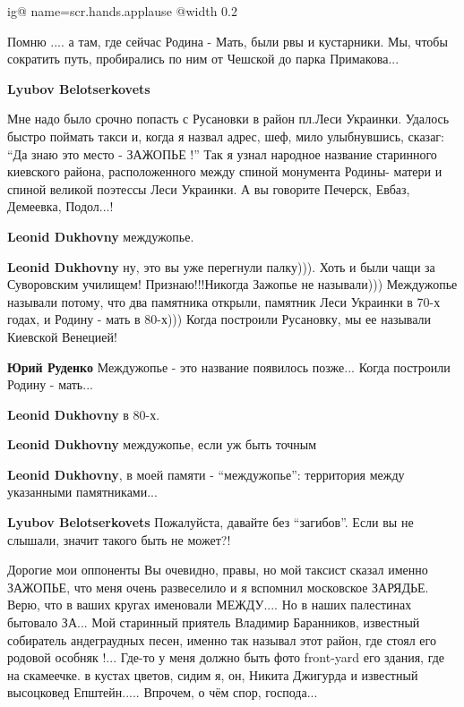 \begin{itemize}

\ifcmt
  ig@ name=scr.hands.applause
  @width 0.2
\fi

Помню ....
а там, где сейчас Родина - Мать, были рвы и кустарники. Мы, чтобы сократить
путь, пробирались по ним от Чешской до парка Примакова...

\begin{itemize} %
\textbf{Lyubov Belotserkovets} 

Мне надо было срочно попасть с Русановки в район пл.Леси Украинки. Удалось
быстро поймать такси и, когда я назвал адрес, шеф, мило улыбнувшись, сказаг:
\enquote{Да знаю это место - ЗАЖОПЬЕ !} Так я узнал народное название
старинного киевского района, расположенного между спиной монумента Родины-
матери и спиной великой поэтессы Леси Украинки. А вы говорите Печерск, Евбаз,
Демеевка, Подол...!

\begin{itemize} %
\textbf{Leonid Dukhovny} междужопье.

\textbf{Leonid Dukhovny} ну, это вы уже перегнули палку))). Хоть и были чащи за Суворовским училищем! Признаю!!!Никогда Зажопье не называли)))
Междужопье называли потому, что два памятника открыли, памятник Леси Украинки в 70-х годах, и Родину - мать в 80-х)))
Когда построили Русановку, мы ее называли Киевской Венецией!

\textbf{Юрий Руденко} Междужопье - это название появилось позже... Когда построили Родину - мать...

\textbf{Leonid Dukhovny} в 80-х.

\textbf{Leonid Dukhovny} междужопье, если уж быть точным

\textbf{Leonid Dukhovny}, в моей памяти - \enquote{междужопье}: территория между указанными памятниками...

\textbf{Lyubov Belotserkovets} Пожалуйста, давайте без \enquote{загибов}. Если вы не слышали, значит такого быть не может?!
\end{itemize} %


Дорогие мои оппоненты Вы очевидно, правы, но мой таксист сказал именно
ЗАЖОПЬЕ, что меня очень развеселило и я вспомнил московское ЗАРЯДЬЕ. Верю, что
в ваших кругах именовали МЕЖДУ.... Но в наших палестинах бытовало ЗА... Мой
старинный приятель Владимир Баранников, известный собиратель андеграудных
песен, именно так называл этот район, где стоял его родовой особняк !... Где-то
у меня должно быть фото front-yard его здания, где на скамеечке. в кустах
цветов, сидим я, он, Никита Джигурда и известный высоцковед
Епштейн..... Впрочем, о чём спор, господа...


\end{itemize}
\end{itemize}
